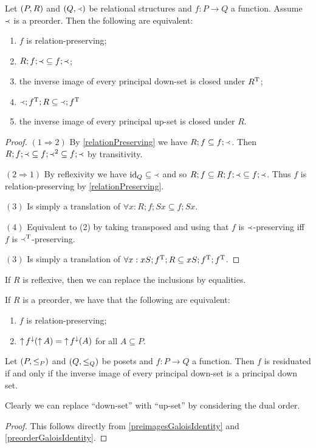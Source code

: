 \begin{proposition} \label{monotonicityOrderClosure}
Let $\sSet{P,R}$ and $\sSet{Q,\Yleft}$ be relational structures and $f:P\to Q$ a function. Assume $\Yleft$ is a preorder. Then the following are equivalent:
\begin{enumerate}
\item $f$ is relation-preserving;
\item $R;f;\Yleft \subseteq f;\Yleft$;
\item the inverse image of every principal down-set is closed under $R^{\mathrm{T}}$;
\item $\Yleft;f^{\mathrm{T}}; R \subseteq \Yleft;f^{\mathrm{T}}$
\item the inverse image of every principal up-set is closed under $R$.
\end{enumerate}
\end{proposition}
\begin{proof}
$(1 \Rightarrow 2)$ By \ref{relationPreserving} we have $R;f \subseteq f;\Yleft$. Then $R;f;\Yleft \subseteq f;\Yleft^2 \subseteq f;\Yleft$ by transitivity.

$(2 \Rightarrow 1)$ By reflexivity we have $\operatorname{id}_Q \subseteq \Yleft$ and so $R;f \subseteq R;f;\Yleft \subseteq f;\Yleft$. Thus $f$ is relation-preserving by \ref{relationPreserving}.

$(3)$ Is simply a translation of $\forall x: R;f;Sx \subseteq f;Sx$.

$(4)$ Equivalent to (2) by taking transposed and using that $f$ is $\Yleft$-preserving iff $f$ is $\Yleft^{\mathrm{T}}$-preserving.

$(3)$ Is simply a translation of $\forall x: xS;f^{\mathrm{T}}; R \subseteq xS;f^{\mathrm{T}};f^{\mathrm{T}}$.
\end{proof}
\begin{corollary}
If $R$ is reflexive, then we can replace the inclusions by equalities.

If $R$ is a preorder, we have that the following are equivalent:
\begin{enumerate}
\item $f$ is relation-preserving;
\item $\operatorname{\uparrow} f^\downarrow(\operatorname{\uparrow} A) = \operatorname{\uparrow} f^\downarrow(A)$ for all $A\subseteq P$.
\end{enumerate}
\end{corollary}

\begin{proposition}
Let $\sSet{P,\leq_P}$ and $\sSet{Q,\leq_Q}$ be posets and $f:P\to Q$ a function. Then $f$ is residuated \textup{if and only if} the inverse image of every principal down-set is a principal down set.
\end{proposition}
Clearly we can replace ``down-set'' with ``up-set'' by considering the dual order.
\begin{proof}
This follows directly from \ref{preimagesGaloisIdentity} and \ref{preorderGaloisIdentity}.
\end{proof}

